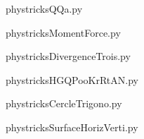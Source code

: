     \newcommand{\CaptionFigQQa}{<+Type your caption here+>}
    \begin{center}
        
    \end{center}
    phystricksQQa.py

    

    \clearpage
    


    \newcommand{\CaptionFigMomentForce}{<+Type your caption here+>}
    \begin{center}
        
    \end{center}
    phystricksMomentForce.py

    

    \clearpage
    


    \newcommand{\CaptionFigDivergenceTrois}{<+Type your caption here+>}
    \begin{center}
        
    \end{center}
    phystricksDivergenceTrois.py

    

    \clearpage
    


    \newcommand{\CaptionFigHGQPooKrRtAN}{<+Type your caption here+>}
    \begin{center}
        
    \end{center}
    phystricksHGQPooKrRtAN.py

    

    \clearpage
    


    \newcommand{\CaptionFigCercleTrigono}{<+Type your caption here+>}
    \begin{center}
        
    \end{center}
    phystricksCercleTrigono.py

    

    \clearpage
    


    \newcommand{\CaptionFigSurfaceHorizVerti}{<+Type your caption here+>}
    \begin{center}
        
    \end{center}
    phystricksSurfaceHorizVerti.py

